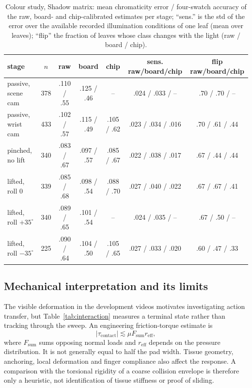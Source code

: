 \documentclass[letterpaper, 10 pt, conference]{ieeeconf}
\begin{document}
\begin{table}[t]
\caption{Colour study, Shadow matrix: mean chromaticity error / four-swatch accuracy of the
raw, board- and chip-calibrated estimates per stage; ``sens.'' is the std of the error over
the available recorded illumination conditions of one leaf (mean over leaves); ``flip'' the fraction of
leaves whose class changes with the light (raw / board / chip).}
\label{tab:colour}
\centering\scriptsize
\setlength{\tabcolsep}{3pt}
\begin{tabular}{@{}lcccccc@{}}
\toprule
stage & $n$ & raw & board & chip & sens. raw/board/chip & flip raw/board/chip \\
\midrule
passive, scene cam & 378 & .110 / .55 & .125 / .46 & -- & .024 / .033 / -- & .70 / .70 / -- \\
passive, wrist cam & 433 & .102 / .57 & .115 / .49 & .105 / .62 & .023 / .034 / .016 & .70 / .61 / .44 \\
pinched, no lift & 340 & .083 / .67 & .097 / .57 & .085 / .67 & .022 / .038 / .017 & .67 / .44 / .44 \\
lifted, roll 0 & 339 & .085 / .68 & .098 / .54 & .088 / .70 & .027 / .040 / .022 & .67 / .67 / .41 \\
lifted, roll $+35^\circ$ & 340 & .089 / .65 & .101 / .54 & -- & .024 / .035 / -- & .67 / .50 / -- \\
lifted, roll $-35^\circ$ & 225 & .090 / .64 & .104 / .50 & .105 / .65 & .027 / .033 / .020 & .60 / .47 / .33 \\
\bottomrule
\end{tabular}
\end{table}

\subsection{Mechanical interpretation and its limits}\label{sec:turn}
The visible deformation in the development videos motivates investigating action transfer,
but Table~\ref{tab:interaction} measures a terminal state rather than tracking through the
sweep. An engineering friction-torque estimate is
\begin{equation}
 |\tau_{\mathrm{contact}}| \lesssim \mu F_{\mathrm{sum}}r_{\mathrm{eff}},
\end{equation}
where $F_{\mathrm{sum}}$ sums opposing normal loads and $r_{\mathrm{eff}}$ depends on the
pressure distribution. It is not generally equal to half the pad width. Tissue geometry,
anchoring, local deformation and finger compliance also affect the response. A comparison
with the torsional rigidity of a coarse collision envelope is therefore only a heuristic,
not identification of tissue stiffness or proof of sliding.
\end{document}
